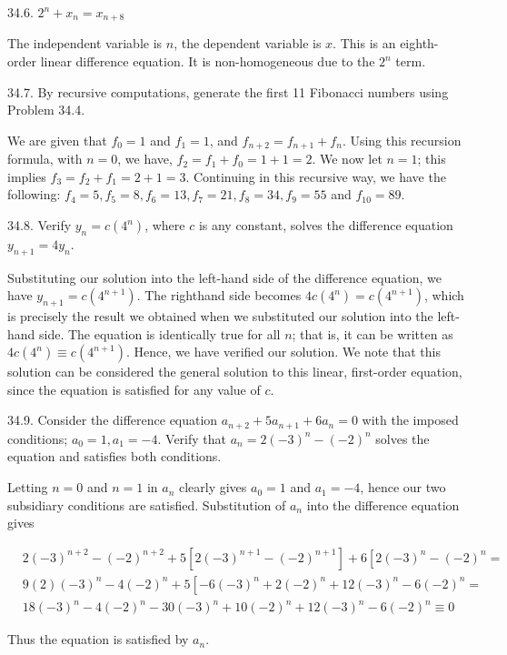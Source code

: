 \documentclass[10pt]{article}
\begin{document}
34.6. $2^{n}+x_{n}=x_{n+8}$

The independent variable is $n$, the dependent variable is $x$. This is an eighth-order linear difference equation. It is non-homogeneous due to the $2^{n}$ term.

34.7. By recursive computations, generate the first 11 Fibonacci numbers using Problem 34.4.

We are given that $f_{0}=1$ and $f_{1}=1$, and $f_{n+2}=f_{n+1}+f_{n}$. Using this recursion formula, with $n=0$, we have, $f_{2}=f_{1}+f_{0}=1+1=2$. We now let $n=1$; this implies $f_{3}=f_{2}+f_{1}=2+1=3$. Continuing in this recursive way, we have the following: $f_{4}=5, f_{5}=8, f_{6}=13, f_{7}=21, f_{8}=34, f_{9}=55$ and $f_{10}=89$.

34.8. Verify $y_{n}=c\left(4^{n}\right)$, where $c$ is any constant, solves the difference equation $y_{n+1}=4 y_{n}$.

Substituting our solution into the left-hand side of the difference equation, we have $y_{n+1}=c\left(4^{n+1}\right)$. The righthand side becomes $4 c\left(4^{n}\right)=c\left(4^{n+1}\right)$, which is precisely the result we obtained when we substituted our solution into the left-hand side. The equation is identically true for all $n$; that is, it can be written as $4 c\left(4^{n}\right) \equiv c\left(4^{n+1}\right)$. Hence, we have verified our solution. We note that this solution can be considered the general solution to this linear, first-order equation, since the equation is satisfied for any value of $c$.

34.9. Consider the difference equation $a_{n+2}+5 a_{n+1}+6 a_{n}=0$ with the imposed conditions; $a_{0}=1, a_{1}=-4$. Verify that $a_{n}=2(-3)^{n}-(-2)^{n}$ solves the equation and satisfies both conditions.

Letting $n=0$ and $n=1$ in $a_{n}$ clearly gives $a_{0}=1$ and $a_{1}=-4$, hence our two subsidiary conditions are satisfied. Substitution of $a_{n}$ into the difference equation gives

$$
\begin{aligned}
& 2(-3)^{n+2}-(-2)^{n+2}+5\left[2(-3)^{n+1}-(-2)^{n+1}\right]+6\left[2(-3)^{n}-(-2)^{n}=\right. \\
& 9(2)(-3)^{n}-4(-2)^{n}+5\left[-6(-3)^{n}+2(-2)^{n}+12(-3)^{n}-6(-2)^{n}=\right. \\
& 18(-3)^{n}-4(-2)^{n}-30(-3)^{n}+10(-2)^{n}+12(-3)^{n}-6(-2)^{n} \equiv 0
\end{aligned}
$$

Thus the equation is satisfied by $a_{n}$.
\end{document}
